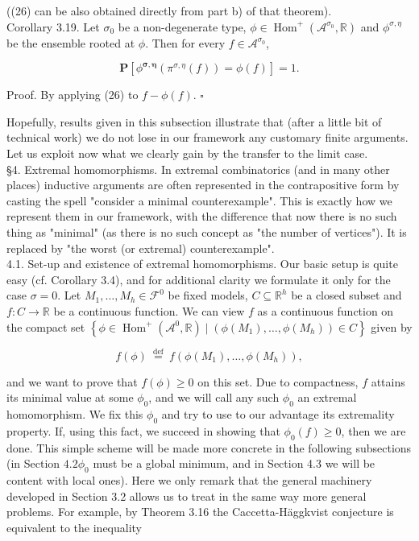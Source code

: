 \documentclass[10pt]{article}
\begin{document}
((26) can be also obtained directly from part b) of that theorem).\\
Corollary 3.19. Let $\sigma_{0}$ be a non-degenerate type, $\phi \in \operatorname{Hom}^{+}\left(\mathcal{A}^{\sigma_{0}}, \mathbb{R}\right)$ and $\phi^{\sigma, \eta}$ be the ensemble rooted at $\phi$. Then for every $f \in \mathcal{A}^{\sigma_{0}}$,

$$
\mathbf{P}\left[\phi^{\boldsymbol{\sigma}, \boldsymbol{\eta}}\left(\pi^{\sigma, \eta}(f)\right)=\phi(f)\right]=1 .
$$

Proof. By applying (26) to $f-\phi(f)$. \(\square\)

Hopefully, results given in this subsection illustrate that (after a little bit of technical work) we do not lose in our framework any customary finite arguments. Let us exploit now what we clearly gain by the transfer to the limit case.\\
§4. Extremal homomorphisms. In extremal combinatorics (and in many other places) inductive arguments are often represented in the contrapositive form by casting the spell "consider a minimal counterexample". This is exactly how we represent them in our framework, with the difference that now there is no such thing as "minimal" (as there is no such concept as "the number of vertices"). It is replaced by "the worst (or extremal) counterexample".\\
4.1. Set-up and existence of extremal homomorphisms. Our basic setup is quite easy (cf. Corollary 3.4), and for additional clarity we formulate it only for the case $\sigma=0$. Let $M_{1}, \ldots, M_{h} \in \mathcal{F}^{0}$ be fixed models, $C \subseteq \mathbb{R}^{h}$ be a closed subset and $f: C \longrightarrow \mathbb{R}$ be a continuous function. We can view $f$ as a continuous function on the compact set $\left\{\phi \in \operatorname{Hom}^{+}\left(\mathcal{A}^{0}, \mathbb{R}\right) \mid\left(\phi\left(M_{1}\right), \ldots, \phi\left(M_{h}\right)\right) \in C\right\}$ given by

$$
f(\phi) \stackrel{\text { def }}{=} f\left(\phi\left(M_{1}\right), \ldots, \phi\left(M_{h}\right)\right),
$$

and we want to prove that $f(\phi) \geq 0$ on this set. Due to compactness, $f$ attains its minimal value at some $\phi_{0}$, and we will call any such $\phi_{0}$ an extremal homomorphism. We fix this $\phi_{0}$ and try to use to our advantage its extremality property. If, using this fact, we succeed in showing that $\phi_{0}(f) \geq 0$, then we are done. This simple scheme will be made more concrete in the following subsections (in Section $4.2 \phi_{0}$ must be a global minimum, and in Section 4.3 we will be content with local ones). Here we only remark that the general machinery developed in Section 3.2 allows us to treat in the same way more general problems. For example, by Theorem 3.16 the Caccetta-Häggkvist conjecture is equivalent to the inequality
\end{document}
